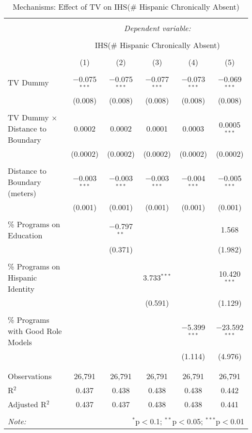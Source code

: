 
\begin{table}[!htbp] \centering 
  \caption{Mechanisms: Effect of TV on IHS(\# Hispanic Chronically Absent)} 
  \label{} 
\begin{tabular}{@{\extracolsep{-2pt}}lccccc} 
\\[-1.8ex]\hline 
\hline \\[-1.8ex] 
 & \multicolumn{5}{c}{\textit{Dependent variable:}} \\ 
\cline{2-6} 
\\[-1.8ex] & \multicolumn{5}{c}{IHS(\# Hispanic Chronically Absent)} \\ 
\\[-1.8ex] & (1) & (2) & (3) & (4) & (5)\\ 
\hline \\[-1.8ex] 
 TV Dummy & $-$0.075$^{***}$ & $-$0.075$^{***}$ & $-$0.077$^{***}$ & $-$0.073$^{***}$ & $-$0.069$^{***}$ \\ 
  & (0.008) & (0.008) & (0.008) & (0.008) & (0.008) \\ 
  & & & & & \\ 
 TV Dummy $\times$ Distance to Boundary & 0.0002 & 0.0002 & 0.0001 & 0.0003 & 0.0005$^{***}$ \\ 
  & (0.0002) & (0.0002) & (0.0002) & (0.0002) & (0.0002) \\ 
  & & & & & \\ 
 Distance to Boundary (meters) & $-$0.003$^{***}$ & $-$0.003$^{***}$ & $-$0.003$^{***}$ & $-$0.004$^{***}$ & $-$0.005$^{***}$ \\ 
  & (0.001) & (0.001) & (0.001) & (0.001) & (0.001) \\ 
  & & & & & \\ 
 \% Programs on Education &  & $-$0.797$^{**}$ &  &  & 1.568 \\ 
  &  & (0.371) &  &  & (1.982) \\ 
  & & & & & \\ 
 \% Programs on Hispanic Identity &  &  & 3.733$^{***}$ &  & 10.420$^{***}$ \\ 
  &  &  & (0.591) &  & (1.129) \\ 
  & & & & & \\ 
 \% Programs with Good Role Models &  &  &  & $-$5.399$^{***}$ & $-$23.592$^{***}$ \\ 
  &  &  &  & (1.114) & (4.976) \\ 
  & & & & & \\ 
\hline \\[-1.8ex] 
Observations & 26,791 & 26,791 & 26,791 & 26,791 & 26,791 \\ 
R$^{2}$ & 0.437 & 0.438 & 0.438 & 0.438 & 0.442 \\ 
Adjusted R$^{2}$ & 0.437 & 0.437 & 0.438 & 0.438 & 0.441 \\ 
\hline 
\hline \\[-1.8ex] 
\textit{Note:}  & \multicolumn{5}{r}{$^{*}$p$<$0.1; $^{**}$p$<$0.05; $^{***}$p$<$0.01} \\ 
\end{tabular} 
\end{table} 
